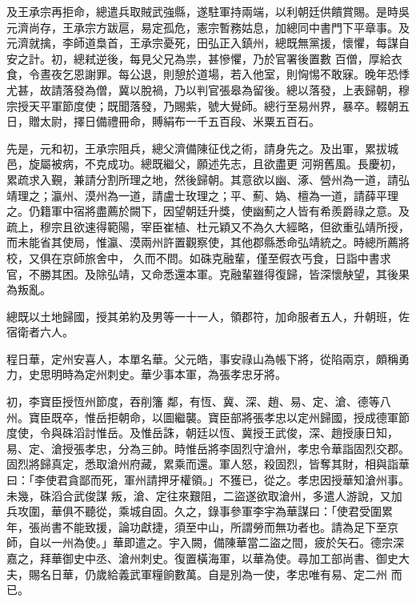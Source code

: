 \begin{pinyinscope}
 及王承宗再拒命，總遣兵取賊武強縣，遂駐軍持兩端，以利朝廷供饋賞賜。是時吳元濟尚存，王承宗方跋扈，易定孤危，憲宗暫務姑息，加總同中書門下平章事。及元濟就擒，李師道梟首，王承宗憂死，田弘正入鎮州，總既無黨援，懷懼，每謀自安之計。初，總弒逆後，每見父兄為祟，甚慘懼，乃於官署後置數
 百僧，厚給衣食，令晝夜乞恩謝罪。每公退，則憩於道場，若入他室，則恟惕不敢寐。晚年恐悸尤甚，故請落發為僧，冀以脫禍，乃以判官張皋為留後。總以落發，上表歸朝，穆宗授天平軍節度使；既聞落發，乃賜紫，號大覺師。總行至易州界，暴卒。輟朝五日，贈太尉，擇日備禮冊命，賻絹布一千五百段、米粟五百石。



 先是，元和初，王承宗阻兵，總父濟備陳征伐之術，請身先之。及出軍，累拔城邑，旋屬被病，不克成功。總既繼父，願述先志，且欲盡更
 河朔舊風。長慶初，累疏求入覲，兼請分割所理之地，然後歸朝。其意欲以幽、涿、營州為一道，請弘靖理之；瀛州、漠州為一道，請盧士玫理之；平、薊、媯、檀為一道，請薛平理之。仍籍軍中宿將盡薦於闕下，因望朝廷升獎，使幽薊之人皆有希羨爵祿之意。及疏上，穆宗且欲速得範陽，宰臣崔植、杜元穎又不為久大經略，但欲重弘靖所授，而未能省其使局，惟瀛、漠兩州許置觀察使，其他郡縣悉命弘靖統之。時總所薦將校，又俱在京師旅舍中，
 久而不問。如硃克融輩，僅至假衣丐食，日詣中書求官，不勝其困。及除弘靖，又命悉還本軍。克融輩雖得復歸，皆深懷觖望，其後果為叛亂。



 總既以土地歸國，授其弟約及男等一十一人，領郡符，加命服者五人，升朝班，佐宿衛者六人。



 程日華，定州安喜人，本單名華。父元皓，事安祿山為帳下將，從陷兩京，頗稱勇力，史思明時為定州刺史。華少事本軍，為張孝忠牙將。



 初，李寶臣授恆州節度，吞削籓
 鄰，有恆、冀、深、趙、易、定、滄、德等八州。寶臣既卒，惟岳拒朝命，以圖繼襲。寶臣部將張孝忠以定州歸國，授成德軍節度使，令與硃滔討惟岳。及惟岳誅，朝廷以恆、冀授王武俊，深、趙授康日知，易、定、滄授張孝忠，分為三帥。時惟岳將李固烈守滄州，孝忠令華詣固烈交郡。固烈將歸真定，悉取滄州府藏，累乘而還。軍人怒，殺固烈，皆奪其財，相與詣華曰：「李使君貪鄙而死，軍州請押牙權領。」不獲已，從之。孝忠因授華知滄州事。未幾，硃滔合武俊謀
 叛，滄、定往來艱阻，二盜遂欲取滄州，多遣人游說，又加兵攻圍，華俱不聽從，乘城自固。久之，錄事參軍李宇為華謀曰：「使君受圍累年，張尚書不能致援，論功獻捷，須至中山，所謂勞而無功者也。請為足下至京師，自以一州為使。」華即遣之。宇入闕，備陳華當二盜之間，疲於矢石。德宗深嘉之，拜華御史中丞、滄州刺史。復置橫海軍，以華為使。尋加工部尚書、御史大夫，賜名日華，仍歲給義武軍糧餉數萬。自是別為一使，孝忠唯有易、定二州
 而已。




\end{pinyinscope}
